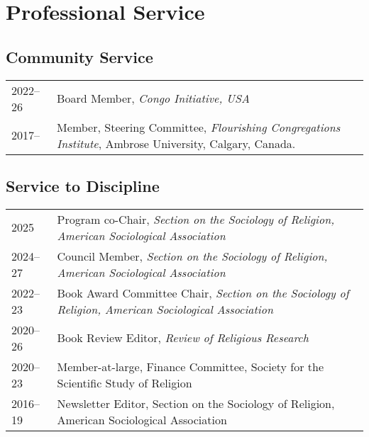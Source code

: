 \section*{Professional Service}
\newcommand{\tabitem}{~~\llap{\textbullet}~~}
\subsection*{Community Service}
\begin{tabular}{p{} p{}}
2022--26 & Board Member, \textit{Congo Initiative, USA}\\
2017-- & Member, Steering Committee, \textit{Flourishing Congregations Institute}, Ambrose University, Calgary, Canada.\\
\end{tabular}

\subsection*{Service to Discipline}

\begin{tabular}{p{} p{}}
2025 & Program co-Chair, \textit{Section on the Sociology of Religion, American Sociological Association}\\
2024--27 & Council Member, \textit{Section on the Sociology of Religion, American Sociological Association}\\
2022--23 & Book Award Committee Chair, \textit{Section on the Sociology of Religion, American Sociological Association}\\
2020--26 & Book Review Editor, \textit{Review of Religious Research}\\
2020--23 & Member-at-large, Finance Committee, Society for the Scientific Study of Religion\\
2016--19 & Newsletter Editor, Section on the Sociology of Religion, American Sociological Association\\
\end{tabular}


